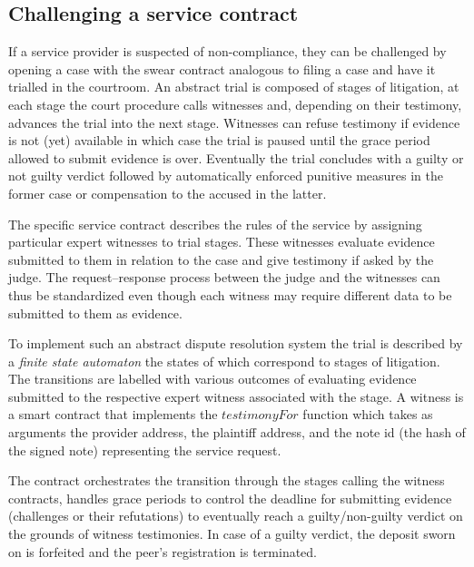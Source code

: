 \subsection{Challenging a service contract}
\label{sec:swindle}

If a service provider is suspected of non-compliance, they can be challenged
by opening a case with the swear contract analogous to filing a case and have it 
trialled in the courtroom.
An abstract trial is composed of stages of litigation, at each stage
the court procedure calls witnesses and, depending on their testimony,
advances the trial into the next stage. Witnesses can refuse testimony
if evidence is not (yet) available in which case the trial
is paused until the grace period allowed to submit evidence is over.
Eventually the trial concludes with a guilty or not guilty verdict followed
by automatically enforced punitive measures in the former case or
compensation to the accused in the latter.

The specific service contract describes the rules of the service
by assigning particular expert witnesses to trial stages. These witnesses
evaluate evidence submitted to them in relation to the case
and give testimony if asked by the judge.
The request--response process between the judge and the witnesses can
thus be standardized
even though each witness may require different data to be submitted to them as evidence.

To implement such an abstract dispute resolution system
the trial is described by a \emph{finite state automaton} the states of which correspond to stages of litigation. 
The transitions are labelled with various outcomes of evaluating evidence submitted
to the respective expert witness associated with the stage. A witness
is a smart contract that implements the $\mathit{testimonyFor}$ function which takes
as arguments the provider address, the plaintiff address, and the note id (the hash of the signed note)
representing the service request.

The  contract orchestrates the transition through the stages calling the witness contracts,
handles grace periods to control the deadline for submitting evidence (challenges or their refutations) to
eventually reach a guilty/non-guilty verdict on the grounds of witness testimonies.
In case of a guilty verdict, the deposit sworn on is forfeited and the peer's registration is
terminated. 

